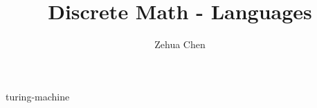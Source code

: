 \documentclass[letterpaper, 12pt]{report}
\title{Discrete Math - Languages}
\author{Zehua Chen}
\begin{document}
  \maketitle
  \tableofcontents

  {turing-machine}
\end{document}
